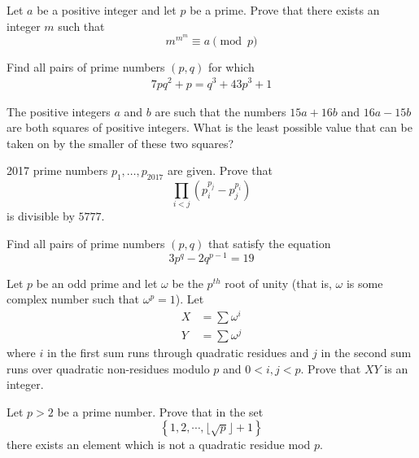 \documentclass{subfile}
\begin{document}
	\begin{problem}[ELMO 2000] %
		Let $a$ be a positive integer and let $p$ be a prime. Prove that there exists an integer $m$ such that \[ m^{m^m} \equiv a \pmod p\]
	\end{problem}

	\begin{problem} %
		Find all pairs of prime numbers $(p,q)$ for which
		\begin{align*}
		7pq^2 + p = q^3 + 43p^3 + 1
		\end{align*}
	\end{problem}

	\begin{problem} [IMO 1996] %
		The positive integers $ a$ and $ b$ are such that the numbers $ 15a + 16b$ and $ 16a - 15b$ are both squares of positive integers. What is the least possible value that can be taken on by the smaller of these two squares?
	\end{problem}

	\begin{problem} %
		2017 prime numbers $p_1,\ldots,p_{2017}$ are given. Prove that $$\prod_{i<j} (p_i^{p_j}-p_j^{p_i})$$ is divisible by $5777$.
	\end{problem}

	\begin{problem}[Ukraine 2014] %
		Find all pairs of prime numbers $(p,q)$ that satisfy the equation $$3p^{q}-2q^{p-1}=19$$
	\end{problem}

	\begin{problem} %
		Let $p$ be an odd prime and let $\omega$ be the $p^{th}$ root of unity (that is, $\omega$ is some complex number such that $\omega^p = 1$). Let
			\begin{align*}
				X
					& =\sum \omega^i\\
				Y
					& =\sum \omega^j
			\end{align*}
		where $i$ in the first sum runs through quadratic residues and $j$ in the second sum runs over quadratic non-residues modulo $p$ and $0<i,j<p$. Prove that $XY$ is an integer.
	\end{problem}

	\begin{problem} %
		Let $p>2$ be a prime number. Prove that in the set $$\left\{1,2, \cdots ,\lfloor{\sqrt{p}}\rfloor+1\right\}$$ there exists an element which is not a quadratic residue mod $p$.
	\end{problem}
\end{document}
